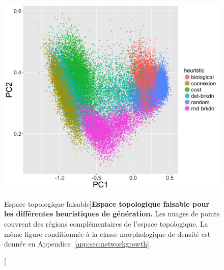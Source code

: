 \begin{figure}
\includegraphics[width=\linewidth]{Figures/Final/7-1-2-fig-networkgrowth-feasiblespace.jpg}
\caption[Feasible topological space][Espace topologique faisable]{}{\textbf{Espace topologique faisable pour les différentes heuristiques de génération.} Les nuages de points couvrent des régions complémentaires de l'espace topologique. La même figure conditionnée à la classe morphologique de densité est donnée en Appendice~\ref{app:sec:networkgrowth}.\label{fig:networkgrowth:feasiblespace}}
\end{figure}

%



